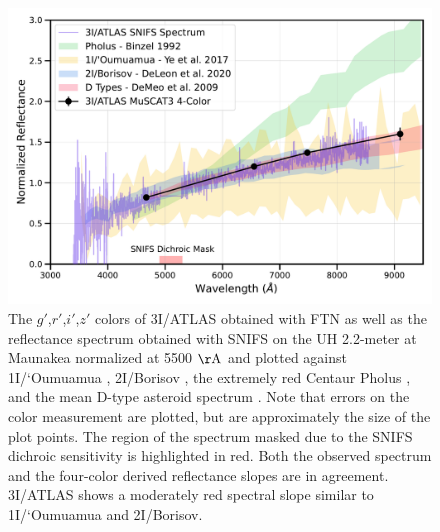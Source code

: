 \documentclass[linenumbers,twocolumn,longbib]{aastex7}
\begin{document}
\begin{figure}
\includegraphics[width=1.\linewidth]{figures/3I_color_comp_v3.pdf}
\caption{The $g'$,$r'$,$i'$,$z'$ colors of 3I/ATLAS obtained with FTN as well as the reflectance spectrum obtained with SNIFS on the UH 2.2-meter at Maunakea normalized at 5500 $\mathrm{\AA}$ and plotted against 1I/`Oumuamua \citep{Ye2017}, 2I/Borisov \citep{deleon2020}, the extremely red Centaur Pholus \citep{Binzel1992}, and the mean D-type asteroid spectrum \citep{DeMeo2009}. Note that errors on the color measurement are plotted, but are approximately the size of the plot points. The region of the spectrum masked due to the SNIFS dichroic sensitivity is highlighted in red. Both the observed spectrum and the four-color derived reflectance slopes are in agreement. 3I/ATLAS shows a moderately red spectral slope similar to 1I/`Oumuamua and 2I/Borisov.}
\label{fig:3I_colors}
\end{figure}
\end{document}
